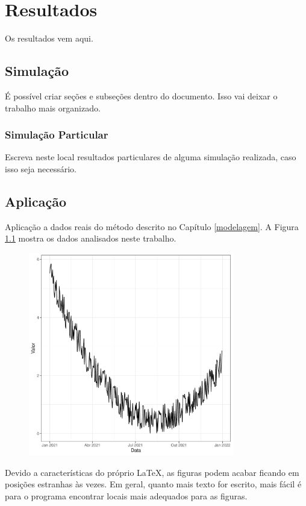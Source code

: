 \chapter{Resultados}\label{resultados}

Os resultados vem aqui.

\section{Simulação}\label{resultadosSimulacao}

É possível criar seções e subseções dentro do documento. Isso vai deixar o trabalho mais organizado.




\subsection{Simulação Particular}\label{resultadosSimulacao_sub}

Escreva neste local resultados particulares de alguma simulação realizada, caso isso seja necessário.



\section{Aplicação}\label{aplicacao}

Aplicação a dados reais do método descrito no Capítulo \ref{modelagem}. A Figura \ref{serietemporal} mostra os dados analisados neste trabalho. 


\begin{figure}[!h]
\centering
\includegraphics[width=0.8\textwidth]{figuras/serie_temporal.pdf}
\label{serietemporal}
\end{figure}


Devido a características do próprio LaTeX, as figuras podem acabar ficando em posições estranhas às vezes. Em geral, quanto mais texto for escrito, mais fácil é para o programa encontrar locais mais adequados para as figuras.


